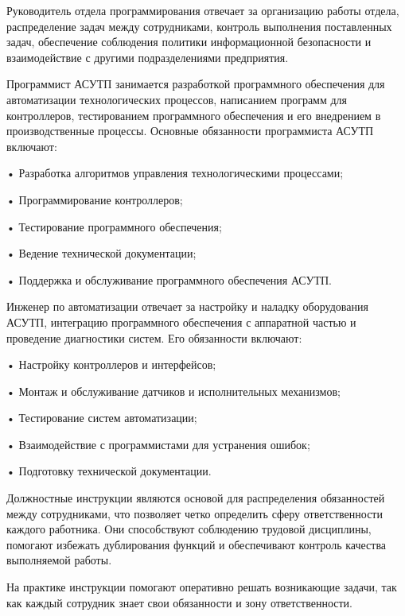 {  \par \redline Руководитель отдела программирования отвечает за организацию работы отдела, распределение задач между сотрудниками, контроль выполнения поставленных задач, обеспечение соблюдения политики информационной безопасности и взаимодействие с другими подразделениями предприятия.

  \par \redline Программист АСУТП занимается разработкой программного обеспечения для автоматизации технологических процессов, написанием программ для контроллеров, тестированием программного обеспечения и его внедрением в производственные процессы. Основные обязанности программиста АСУТП включают:
  \par \redline • Разработка алгоритмов управления технологическими процессами;
  \par \redline • Программирование контроллеров;
  \par \redline • Тестирование программного обеспечения;
  \par \redline • Ведение технической документации;
  \par \redline • Поддержка и обслуживание программного обеспечения АСУТП.

  \par \redline Инженер по автоматизации отвечает за настройку и наладку оборудования АСУТП, интеграцию программного обеспечения с аппаратной частью и проведение диагностики систем. Его обязанности включают:
  \par \redline • Настройку контроллеров и интерфейсов;
  \par \redline • Монтаж и обслуживание датчиков и исполнительных механизмов;
  \par \redline • Тестирование систем автоматизации;
  \par \redline • Взаимодействие с программистами для устранения ошибок;
  \par \redline • Подготовку технической документации.

  \par \redline Должностные инструкции являются основой для распределения обязанностей между сотрудниками, что позволяет четко определить сферу ответственности каждого работника. Они способствуют соблюдению трудовой дисциплины, помогают избежать дублирования функций и обеспечивают контроль качества выполняемой работы.

  \par \redline На практике инструкции помогают оперативно решать возникающие задачи, так как каждый сотрудник знает свои обязанности и зону ответственности. 

  \par 
}



